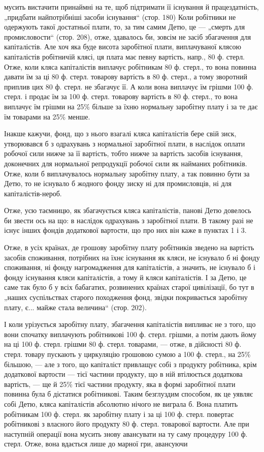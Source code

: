 мусить вистачити принаймні на те, щоб підтримати її існування й
працездатність, „придбати найпотрібніші засоби існування“ (стор. 180)
Коли робітники не одержують такої достатньої плати, то, за тим самим
Детю, це — „смерть для промисловости“ (стор. 208), отже, здавалось би,
зовсім не засіб збагачення для капіталістів. Але хоч яка буде висота заробітної
плати, виплачуваної клясою капіталістів робітничій клясі, ця плата
має певну вартість, напр., 80 ф. стерл. Отже, коли кляса капіталістів
виплачує робітникам 80 ф. стерл., то вона повинна давати їм за ці 80 ф.
стерл. товарову вартість в 80 ф. стерл., а тому зворотний приплив цих
80 ф. стерл. не збагачує її. А коли вона виплачує їм грішми 100 ф. стерл.
і продає їм за 100 ф. стерл. товарову вартість в 80 ф. стерл., то вона
виплачує їм грішми на 25\% більше за їхню нормальну заробітну плату
і за те дає їм товарами на 25\% менше.

Інакше кажучи, фонд, що з нього взагалі кляса капіталістів бере свій
зиск, утворювався б з одрахувань з нормальної заробітної плати, в наслідок
оплати робочої сили нижче за її вартість, тобто нижче за вартість засобів
існування, доконечних для нормальної репродукції робочої сили як
найманих робітників. Отже, коли б виплачувалось нормальну заробітну
плату, а так повинно бути за Детю, то не існувало б жодного фонду
зиску ні для промисловців, ні для капіталістів-нероб.

Отже, усю таємницю, як збагачується кляса капіталістів, панові Детю
довелось би звести ось на що: в наслідок одрахувань з заробітної плати.
В такому разі не існує інших фондів додаткової вартости, що про них
він каже в пунктах 1 і 3.

Отже, в усіх країнах, де грошову заробітну плату робітників зведено
на вартість засобів споживання, потрібних на їхнє існування як кляси,
не існувало б ні фонду споживання, ні фонду нагромадження для капіталістів,
а значить, не існувало б і фонду існування кляси капіталістів, а
тому й кляси капіталістів. І за Детю, це саме так було б у всіх бабагатих,
розвинених країнах старої цивілізації, бо тут в „наших суспільствах
старого походження фонд, звідки покривається заробітну плату,
є... майже стала величина“ (стор. 202).

І коли урізується заробітну плату, збагачення капіталістів випливає
не з того, що вони спочатку виплачують робітникові 100 ф. стерл.
грішми, а потім дають йому на ці 100 ф. стерл. грішми 80 ф. стерл.
товарами, — отже, в дійсності 80 ф. стерл. товару пускають у циркуляцію
грошовою сумою а 100 ф. стерл., на 25\% більшою, — але з того, що капіталіст
привлащує собі з продукту робітника, крім додаткової вартости — тієї
частини продукту, що в ній втілюється додаткова вартість, — ще й
25\% тієї частини продукту, яка в формі заробітної плати повинна була
б дістатися робітникові. Таким безглуздим способом, як це уявляє собі Детю,
кляса капіталістів абсолютно нічого не виграла б. Вона платить робітникам
100 ф. стерл. як заробітну плату і за ці 100 ф. стерл. повертає робітникові
з власного його продукту 80 ф. стерл. товарової вартости. Але
при наступній операції вона мусить знову авансувати на ту саму процедуру
100 ф. стерл. Отже, вона вдається лише до марної гри, авансуючи
